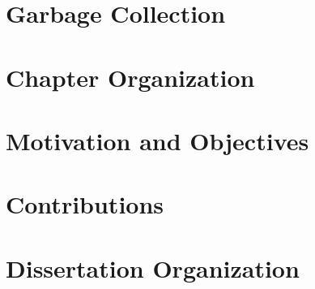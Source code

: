 \section{Garbage Collection}
\section{Chapter Organization}
\section{Motivation and Objectives}
\section{Contributions}
\section{Dissertation Organization}